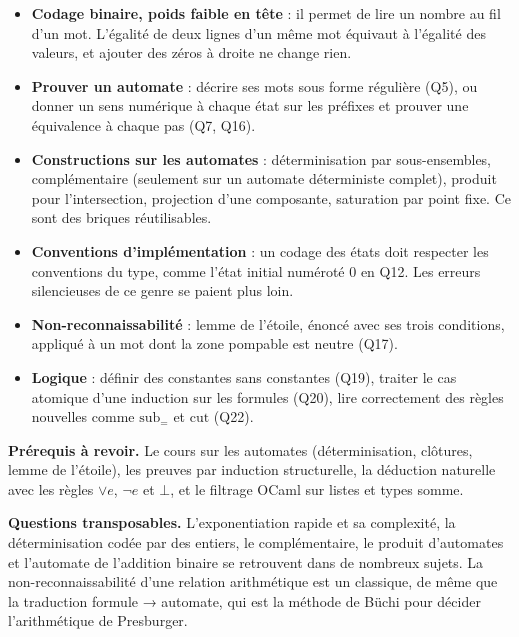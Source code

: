 \documentclass[11pt,a4paper]{article}
\providecommand{\tightlist}{\setlength{\itemsep}{0pt}\setlength{\parskip}{0pt}}
\begin{document}
\begin{itemize}
\tightlist
\item
  \textbf{Codage binaire, poids faible en tête} : il permet de lire un nombre au fil d'un mot. L'égalité de deux lignes d'un même mot équivaut à l'égalité des valeurs, et ajouter des zéros à droite ne change rien.
\item
  \textbf{Prouver un automate} : décrire ses mots sous forme régulière (Q5), ou donner un sens numérique à chaque état sur les préfixes et prouver une équivalence à chaque pas (Q7, Q16).
\item
  \textbf{Constructions sur les automates} : déterminisation par sous-ensembles, complémentaire (seulement sur un automate déterministe complet), produit pour l'intersection, projection d'une composante, saturation par point fixe. Ce sont des briques réutilisables.
\item
  \textbf{Conventions d'implémentation} : un codage des états doit respecter les conventions du type, comme l'état initial numéroté 0 en Q12. Les erreurs silencieuses de ce genre se paient plus loin.
\item
  \textbf{Non-reconnaissabilité} : lemme de l'étoile, énoncé avec ses trois conditions, appliqué à un mot dont la zone pompable est neutre (Q17).
\item
  \textbf{Logique} : définir des constantes sans constantes (Q19), traiter le cas atomique d'une induction sur les formules (Q20), lire correctement des règles nouvelles comme \({\mathrm{sub}}_=\) et \(\mathrm{cut}\) (Q22).
\end{itemize}

\textbf{Prérequis à revoir.} Le cours sur les automates (déterminisation, clôtures, lemme de l'étoile), les preuves par induction structurelle, la déduction naturelle avec les règles \(\vee e\), \(\neg e\) et \(\bot\), et le filtrage OCaml sur listes et types somme.

\textbf{Questions transposables.} L'exponentiation rapide et sa complexité, la déterminisation codée par des entiers, le complémentaire, le produit d'automates et l'automate de l'addition binaire se retrouvent dans de nombreux sujets. La non-reconnaissabilité d'une relation arithmétique est un classique, de même que la traduction formule → automate, qui est la méthode de Büchi pour décider l'arithmétique de Presburger.
\end{document}
